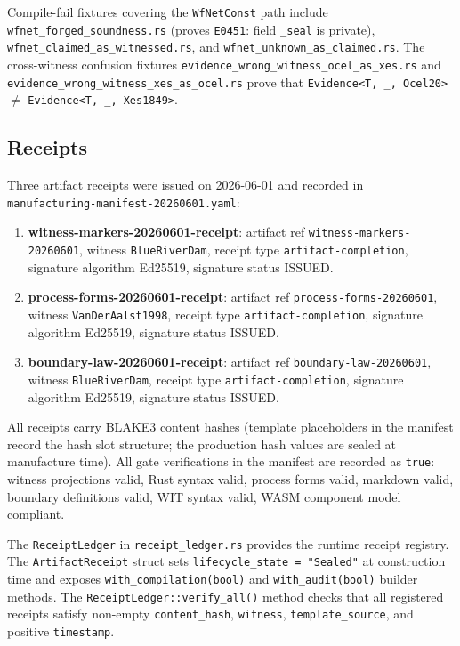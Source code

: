 Compile-fail fixtures covering the \texttt{WfNetConst} path include
\texttt{wfnet\_forged\_soundness.rs} (proves \texttt{E0451}: field \texttt{\_seal} is
private), \texttt{wfnet\_claimed\_as\_witnessed.rs}, and
\texttt{wfnet\_unknown\_as\_claimed.rs}. The cross-witness confusion fixtures
\texttt{evidence\_wrong\_witness\_ocel\_as\_xes.rs} and
\texttt{evidence\_wrong\_witness\_xes\_as\_ocel.rs} prove that
\texttt{Evidence<T, \_, Ocel20>} $\neq$ \texttt{Evidence<T, \_, Xes1849>}.

\subsection{Receipts}
\label{sec:sources-wasm4pm-compat-evidence-receipts}

Three artifact receipts were issued on 2026-06-01 and recorded in
\texttt{manufacturing-manifest-20260601.yaml}:

\begin{enumerate}
  \item \textbf{witness-markers-20260601-receipt}: artifact ref
    \texttt{witness-markers-20260601}, witness \texttt{BlueRiverDam}, receipt type
    \texttt{artifact-completion}, signature algorithm Ed25519, signature status ISSUED.
  \item \textbf{process-forms-20260601-receipt}: artifact ref
    \texttt{process-forms-20260601}, witness \texttt{VanDerAalst1998}, receipt type
    \texttt{artifact-completion}, signature algorithm Ed25519, signature status ISSUED.
  \item \textbf{boundary-law-20260601-receipt}: artifact ref
    \texttt{boundary-law-20260601}, witness \texttt{BlueRiverDam}, receipt type
    \texttt{artifact-completion}, signature algorithm Ed25519, signature status ISSUED.
\end{enumerate}

All receipts carry BLAKE3 content hashes (template placeholders in the manifest record
the hash slot structure; the production hash values are sealed at manufacture time).
All gate verifications in the manifest are recorded as \texttt{true}: witness projections
valid, Rust syntax valid, process forms valid, markdown valid, boundary definitions valid,
WIT syntax valid, WASM component model compliant.

The \texttt{ReceiptLedger} in \texttt{receipt\_ledger.rs} provides the runtime receipt
registry. The \texttt{ArtifactReceipt} struct sets \texttt{lifecycle\_state = "Sealed"}
at construction time and exposes \texttt{with\_compilation(bool)} and
\texttt{with\_audit(bool)} builder methods. The \texttt{ReceiptLedger::verify\_all()}
method checks that all registered receipts satisfy non-empty \texttt{content\_hash},
\texttt{witness}, \texttt{template\_source}, and positive \texttt{timestamp}.

